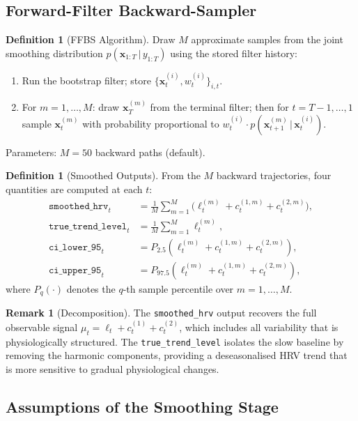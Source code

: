 \documentclass[11pt, a4paper]{article}
\theoremstyle{plain}
\theoremstyle{definition}
\newtheorem{definition}[theorem]{Definition}
\newtheorem{remark}[theorem]{Remark}
\newcommand{\bx}{\mathbf{x}}
\newcommand{\given}{\,|\,}
\begin{document}
\subsection{Forward-Filter Backward-Sampler}

\begin{definition}[FFBS Algorithm]
Draw $M$ approximate samples from the joint smoothing distribution
$p(\bx_{1:T} \given y_{1:T})$ using the stored filter history:
\begin{enumerate}
  \item Run the bootstrap filter; store $\{\bx_t^{(i)}, w_t^{(i)}\}_{i,t}$.
  \item For $m = 1, \ldots, M$: draw $\bx_T^{(m)}$ from the terminal filter;
    then for $t = T-1, \ldots, 1$ sample
    $\bx_t^{(m)}$ with probability proportional to
    $w_t^{(i)} \cdot p(\bx_{t+1}^{(m)} \given \bx_t^{(i)})$.
\end{enumerate}
Parameters: $M = 50$ backward paths (default).
\end{definition}

\begin{definition}[Smoothed Outputs]
From the $M$ backward trajectories, four quantities are computed at each $t$:
\begin{align*}
  \texttt{smoothed\_hrv}_t &= \frac{1}{M}\sum_{m=1}^M
    \bigl(\ell_t^{(m)} + c_t^{(1,m)} + c_t^{(2,m)}\bigr),\\
  \texttt{true\_trend\_level}_t &= \frac{1}{M}\sum_{m=1}^M \ell_t^{(m)},\\
  \texttt{ci\_lower\_95}_t &= P_{2.5}\!\left(\ell_t^{(m)} + c_t^{(1,m)} + c_t^{(2,m)}\right),\\
  \texttt{ci\_upper\_95}_t &= P_{97.5}\!\left(\ell_t^{(m)} + c_t^{(1,m)} + c_t^{(2,m)}\right),
\end{align*}
where $P_q(\cdot)$ denotes the $q$-th sample percentile over $m = 1,\ldots, M$.
\end{definition}

\begin{remark}[Decomposition]
The \texttt{smoothed\_hrv} output recovers the full observable signal
$\mu_t = \ell_t + c_t^{(1)} + c_t^{(2)}$, which includes all variability
that is physiologically structured. The \texttt{true\_trend\_level} isolates
the slow baseline by removing the harmonic components, providing a
deseasonalised HRV trend that is more sensitive to gradual physiological changes.
\end{remark}

\subsection{Assumptions of the Smoothing Stage}
\end{document}
